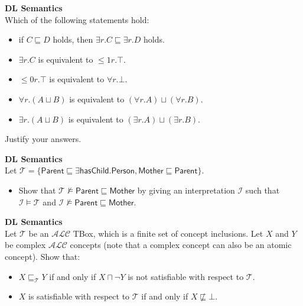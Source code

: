 \documentclass[12pt,a4paper]{article}
\newenvironment{problem}[2][{\color{red}Question}]{\begin{trivlist}
\item[\hskip \labelsep {\bfseries #1}\hskip \labelsep {\bfseries #2.}]}{\end{trivlist}}
\begin{document}
\begin{problem}{{\color{red}6}}
\textbf{DL Semantics}\\
Which of the following statements hold:
\begin{itemize}
    \item if $C\sqsubseteq D$ holds, then $\exists r.C\sqsubseteq\exists r.D$ holds.
    \item $\exists r.C$ is equivalent to $\leq{1}{r}.\top$.
    \item $\leq{0}{r}.\top$ is equivalent to $\forall r.\bot$.
    \item $\forall r.(A\sqcup B)$ is equivalent to $(\forall r.A)\sqcup(\forall r.B)$.
    \item $\exists r.(A\sqcup B)$ is equivalent to $(\exists r.A)\sqcup(\exists r.B)$.
\end{itemize}
Justify your answers.
\end{problem}


\begin{problem}{{\color{red}7}}
\textbf{DL Semantics}\\
Let $\mathcal{T}=\{\textsf{Parent}\sqsubseteq\exists\textsf{hasChild}.\textsf{Person}, \textsf{Mother}\sqsubseteq\textsf{Parent}\}$.
\begin{itemize}
\item Show that $\mathcal{T}\not\models\textsf{Parent}\sqsubseteq\textsf{Mother}$ by giving an interpretation $\mathcal{I}$ such that $\mathcal{I}\models\mathcal{T}$ and $\mathcal{I}\not\models\textsf{Parent}\sqsubseteq\textsf{Mother}$.
\end{itemize}
\end{problem}


\begin{problem}{{\color{red}8}}
\textbf{DL Semantics}\\
Let $\mathcal{T}$ be an $\mathcal{ALC}$ TBox, which is a finite set of concept inclusions. Let $X$ and $Y$ be complex $\mathcal{ALC}$ concepts (note that a complex concept can also be an atomic concept). Show that:
\begin{itemize}
    \item $X\sqsubseteq_{\mathcal{T}}Y$ if and only if $X\sqcap\neg Y$ is not satisfiable with respect to $\mathcal{T}$.
    \item $X$ is satisfiable with respect to $\mathcal{T}$ if and only if $X\not\sqsubseteq\bot$.
\end{itemize}
\end{problem}
\end{document}
